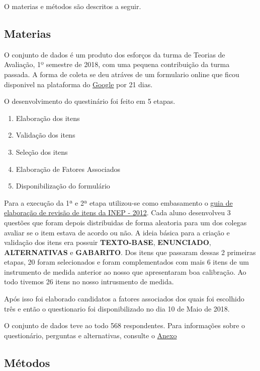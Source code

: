 \documentclass[]{article}
\providecommand{\tightlist}{%
  \setlength{\itemsep}{0pt}\setlength{\parskip}{0pt}}
\begin{document}
O materias e métodos são descritos a seguir.

\subsection{Materias}\label{materias}

O conjunto de dados é um produto dos esforços da turma de Teorias de
Avaliação, 1º semestre de 2018, com uma pequena contribuição da turma
passada. A forma de coleta se deu atráves de um formulario online que
ficou disponivel na plataforma do
\href{https://www.google.com/forms/about/}{Google} por 21 dias.

O desenvolvimento do questinário foi feito em 5 etapas.

\begin{enumerate}
\def\labelenumi{\arabic{enumi}.}
\tightlist
\item
  Elaboração dos itens
\item
  Validação dos itens
\item
  Seleção dos itens
\item
  Elaboração de Fatores Associados
\item
  Disponibilização do formulário
\end{enumerate}

Para a execução da 1ª e 2ª etapa utilizou-se como embasamento o
\href{www.ufpr.br/~aanjos/CE095/guia_elaboracao_revisao_itens_2012_INEP.pdf}{guia
de elaboração de revisão de itens da INEP - 2012}. Cada aluno
desenvolveu 3 questões que foram depois distribuidas de forma aleatoria
para um dos colegas avaliar se o item estava de acordo ou não. A ideia
básica para a criação e validação dos itens era possuir
\textbf{TEXTO-BASE}, \textbf{ENUNCIADO}, \textbf{ALTERNATIVAS} e
\textbf{GABARITO}. Dos itens que passaram dessas 2 primeiras etapas, 20
foram selecionados e foram complementados com mais 6 itens de um
instrumento de medida anterior ao nosso que apresentaram boa calibração.
Ao todo tivemos 26 itens no nosso intrusmento de medida.

Após isso foi elaborado candidatos a fatores associados dos quais foi
escolhido três e então o questionario foi disponibilizado no dia 10 de
Maio de 2018.

O conjunto de dados teve ao todo 568 respondentes. Para informações
sobre o questionário, perguntas e alternativas, consulte o
\protect\hyperlink{Anexo}{Anexo}

\subsection{Métodos}\label{metodos}
\end{document}
